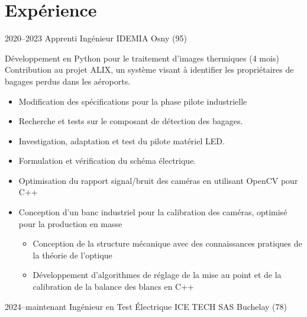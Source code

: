 \documentclass[11pt,a4paper]{moderncv}
\begin{document}
\section{Expérience}
\cventry
    {2020--2023}
    {Apprenti Ingénieur}
    {IDEMIA}
    {Osny (95)}
    {}
    {
    Développement en Python pour le traitement d'images thermiques (4 mois) \newline
    Contribution au projet ALIX, un système visant à identifier les propriétaires de bagages perdus dans les aéroports. 
    \begin{itemize}
        \setlength{\itemindent}{1cm}
        \item Modification des spécifications pour la phase pilote industrielle
        \item Recherche et tests sur le composant de détection des bagages.
        \item Investigation, adaptation et test du pilote matériel LED.
        \item Formulation et vérification du schéma électrique.
        \item Optimisation du rapport signal/bruit des caméras en utilisant OpenCV pour C++
        \item Conception d'un banc industriel pour la calibration des caméras, optimisé pour la production en masse
        \begin{itemize}
            \setlength{\itemindent}{1.5cm}
            \item Conception de la structure mécanique avec des connaissances pratiques de la théorie de l'optique
            \item Développement d'algorithmes de réglage de la mise au point et de la calibration de la balance des blancs en C++
        \end{itemize}
    \end{itemize}
    }
\cventry
    {2024--maintenant}
    {Ingénieur en Test Électrique}
    {ICE TECH SAS}
    {Buchelay (78)}
    {}
\end{document}
